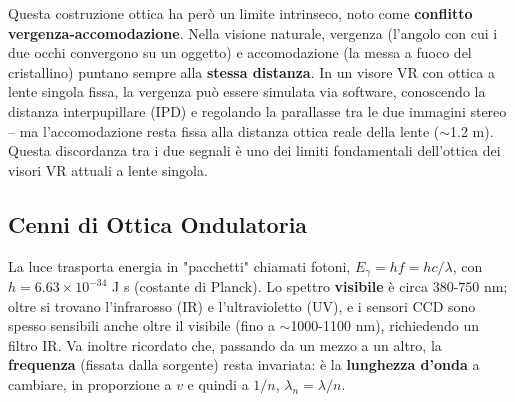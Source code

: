 \documentclass[a4paper,11pt]{article}
\begin{document}
\begin{center}
\end{center}

Questa costruzione ottica ha però un limite intrinseco, noto come \textbf{conflitto vergenza-accomodazione}. Nella visione naturale, vergenza (l'angolo con cui i due occhi convergono su un oggetto) e accomodazione (la messa a fuoco del cristallino) puntano sempre alla \textbf{stessa distanza}. In un visore VR con ottica a lente singola fissa, la vergenza può essere simulata via software, conoscendo la distanza interpupillare (IPD) e regolando la parallasse tra le due immagini stereo -- ma l'accomodazione resta fissa alla distanza ottica reale della lente ($\sim$1.2 m). Questa discordanza tra i due segnali è uno dei limiti fondamentali dell'ottica dei visori VR attuali a lente singola.

\subsection{Cenni di Ottica Ondulatoria}

La luce trasporta energia in "pacchetti" chiamati fotoni, $E_\gamma=hf=hc/\lambda$, con $h=6.63\times10^{-34}$ J s (costante di Planck). Lo spettro \textbf{visibile} è circa $380$-$750$ nm; oltre si trovano l'infrarosso (IR) e l'ultravioletto (UV), e i sensori CCD sono spesso sensibili anche oltre il visibile (fino a $\sim$1000-1100 nm), richiedendo un filtro IR. Va inoltre ricordato che, passando da un mezzo a un altro, la \textbf{frequenza} (fissata dalla sorgente) resta invariata: è la \textbf{lunghezza d'onda} a cambiare, in proporzione a $v$ e quindi a $1/n$, $\lambda_n=\lambda/n$.
\end{document}
